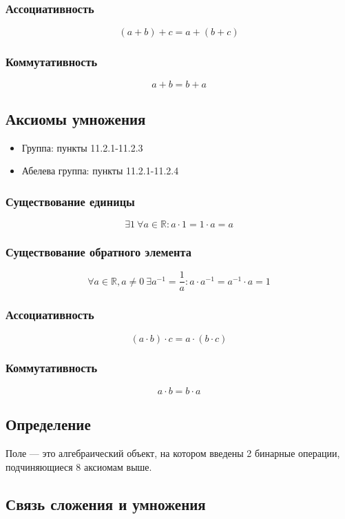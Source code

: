 \documentclass{article}
\begin{document}
\subsubsection{Ассоциативность}
\[
    (a + b) + c = a + (b + c)
\]

\subsubsection{Коммутативность}
\[
    a + b = b + a
\]


\subsection{Аксиомы умножения}
\begin{itemize}
    \item Группа: пункты 11.2.1-11.2.3
    \item Абелева группа: пункты 11.2.1-11.2.4
\end{itemize}

\subsubsection{Существование единицы}
\[
    \exists 1 ~ \forall a \in \mathbb{R}: a \cdot 1 = 1 \cdot a = a
\]

\subsubsection{Существование обратного элемента}
\[
    \forall a \in \mathbb{R}, a \neq 0 ~ \exists a^{-1} = \frac{1}{a}: a \cdot a^{-1} = a^{-1} \cdot a = 1
\]

\subsubsection{Ассоциативность}
\[
    (a \cdot b) \cdot c = a \cdot (b \cdot c)
\]

\subsubsection{Коммутативность}
\[
    a \cdot b = b \cdot a
\]


\subsection{Определение}
Поле --- это алгебраический объект, на котором введены 2 бинарные операции, подчиняющиеся 8 аксиомам выше.


\subsection{Связь сложения и умножения}
\end{document}
